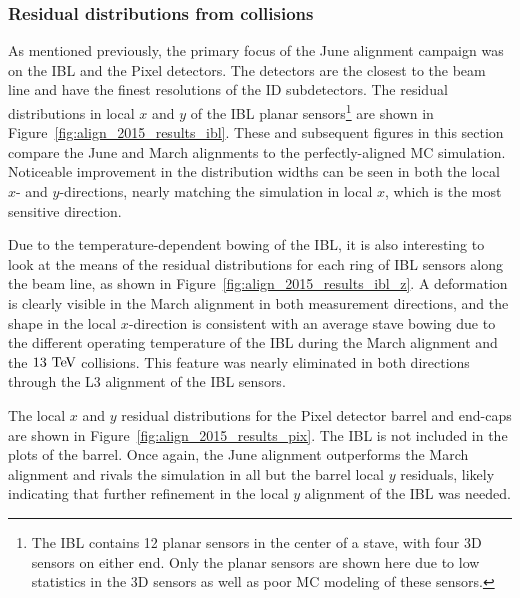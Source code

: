 \subsubsection{Residual distributions from collisions}\label{align:2015_results_residual}
As mentioned previously, the primary focus of the June alignment campaign was on the IBL and the Pixel detectors.
The detectors are the closest to the beam line and have the finest resolutions of the ID subdetectors.
The residual distributions in local $x$ and $y$ of the IBL planar sensors\footnote{The IBL contains 12 planar sensors in the center of a stave, with four 3D sensors on either end.  Only the planar sensors are shown here due to low statistics in the 3D sensors as well as poor MC modeling of these sensors.} are shown in Figure~\ref{fig:align_2015_results_ibl}.
These and subsequent figures in this section compare the June and March alignments to the perfectly-aligned MC simulation.
Noticeable improvement in the distribution widths can be seen in both the local $x$- and $y$-directions, nearly matching the simulation in local $x$, which is the most sensitive direction.

Due to the temperature-dependent bowing of the IBL, it is also interesting to look at the means of the residual distributions for each ring of IBL sensors along the beam line, as shown in Figure~\ref{fig:align_2015_results_ibl_z}.
A deformation is clearly visible in the March alignment in both measurement directions, and the shape in the local $x$-direction is consistent with an average stave bowing due to the different operating temperature of the IBL during the March alignment and the $13\tev$ collisions.
This feature was nearly eliminated in both directions through the L3 alignment of the IBL sensors.

The local $x$ and $y$ residual distributions for the Pixel detector barrel and end-caps are shown in Figure~\ref{fig:align_2015_results_pix}.
The IBL is not included in the plots of the barrel.
Once again, the June alignment outperforms the March alignment and rivals the simulation in all but the barrel local $y$ residuals, likely indicating that further refinement in the local $y$ alignment of the IBL was needed.


